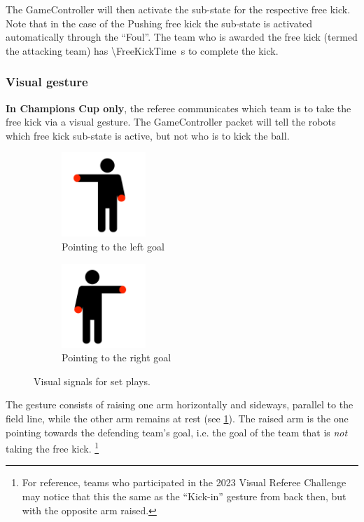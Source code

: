The GameController will then activate the sub-state for the respective free kick.
Note that in the case of the Pushing free kick the sub-state is activated automatically through the ``Foul''.
The team who is awarded the free kick (termed the attacking team) has \qty{\FreeKickTime}{\second} to complete the kick.

\subsubsection{Visual gesture}
\label{sec:free_kick_gesture}

\textbf{In Champions Cup only}, the referee communicates which team is to take the free kick via a visual gesture.
The GameController packet will tell the robots which free kick sub-state is active, but not who is to kick the ball.

\begin{figure}[t]
  \centering
  \begin{subfigure}{.33\textwidth}
      \centering
      \includegraphics[height=120px]{figs/visual-signal/kick-in.png}
      \caption{Pointing to the left goal}
  \end{subfigure}
  \begin{subfigure}{.33\textwidth}
      \centering
      \includegraphics[height=120px]{figs/visual-signal/kick-in-flipped.png}
      \caption{Pointing to the right goal}
  \end{subfigure}
  \caption{Visual signals for set plays.}
  \label{fig:signal_setplay}
\end{figure}

The gesture consists of raising one arm horizontally and sideways, parallel to the field line, while the other arm remains at rest (see \cref{fig:signal_setplay}).
The raised arm is the one pointing towards the defending team's goal, i.e. the goal of the team that is \textit{not} taking the free kick.
\footnote{For reference, teams who participated in the 2023 Visual Referee Challenge
  may notice that this the same as the ``Kick-in'' gesture from back then,
  but with the opposite arm raised.
}

